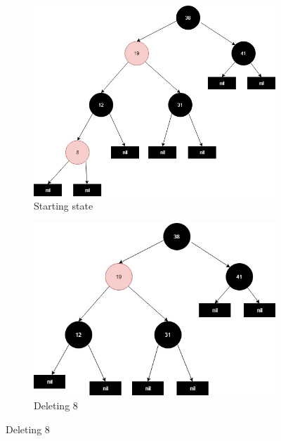 \documentclass[20pt]{article} %
\begin{document}
\begin{figure}[!htbp]
  	\centering
   	\begin{subfigure}[p]{0.4\linewidth}
    	\includegraphics[width=\linewidth]{a1.jpg}
     	\caption{Starting state}
   	\end{subfigure}
  	\begin{subfigure}[p]{0.4\linewidth}
    	\includegraphics[width=\linewidth]{a2.jpg}
    	\caption{Deleting 8}
  	\end{subfigure}


\end{figure}
\end{document}
